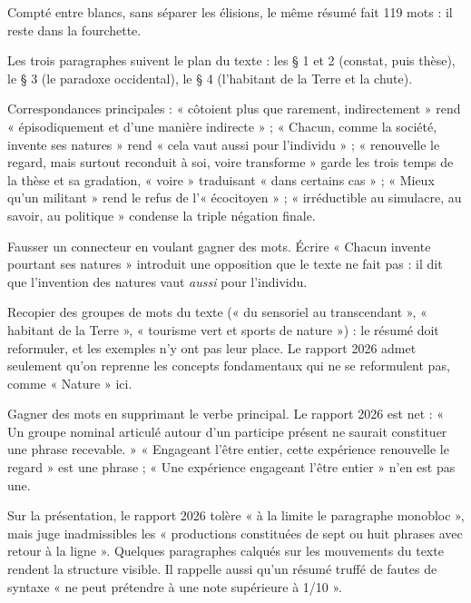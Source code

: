 \documentclass[11pt,a4paper]{article}
\begin{document}
Compté entre blancs, sans séparer les élisions, le même résumé fait 119 mots : il reste dans la fourchette.

Les trois paragraphes suivent le plan du texte : les § 1 et 2 (constat, puis thèse), le § 3 (le paradoxe occidental), le § 4 (l'habitant de la Terre et la chute).

Correspondances principales : « côtoient plus que rarement, indirectement » rend « épisodiquement et d'une manière indirecte » ; « Chacun, comme la société, invente ses natures » rend « cela vaut aussi pour l'individu » ; « renouvelle le regard, mais surtout reconduit à soi, voire transforme » garde les trois temps de la thèse et sa gradation, « voire » traduisant « dans certains cas » ; « Mieux qu'un militant » rend le refus de l'« écocitoyen » ; « irréductible au simulacre, au savoir, au politique » condense la triple négation finale.

\begin{piege}

Fausser un connecteur en voulant gagner des mots. Écrire « Chacun invente pourtant ses natures » introduit une opposition que le texte ne fait pas : il dit que l'invention des natures vaut \emph{aussi} pour l'individu.

\end{piege}

\begin{piege}

Recopier des groupes de mots du texte (« du sensoriel au transcendant », « habitant de la Terre », « tourisme vert et sports de nature ») : le résumé doit reformuler, et les exemples n'y ont pas leur place. Le rapport 2026 admet seulement qu'on reprenne les concepts fondamentaux qui ne se reformulent pas, comme « Nature » ici.

\end{piege}

\begin{piege}

Gagner des mots en supprimant le verbe principal. Le rapport 2026 est net : « Un groupe nominal articulé autour d'un participe présent ne saurait constituer une phrase recevable. » « Engageant l'être entier, cette expérience renouvelle le regard » est une phrase ; « Une expérience engageant l'être entier » n'en est pas une.

\end{piege}

\begin{jury}

Sur la présentation, le rapport 2026 tolère « à la limite le paragraphe monobloc », mais juge inadmissibles les « productions constituées de sept ou huit phrases avec retour à la ligne ». Quelques paragraphes calqués sur les mouvements du texte rendent la structure visible. Il rappelle aussi qu'un résumé truffé de fautes de syntaxe « ne peut prétendre à une note supérieure à 1/10 ».

\end{jury}
\end{document}
